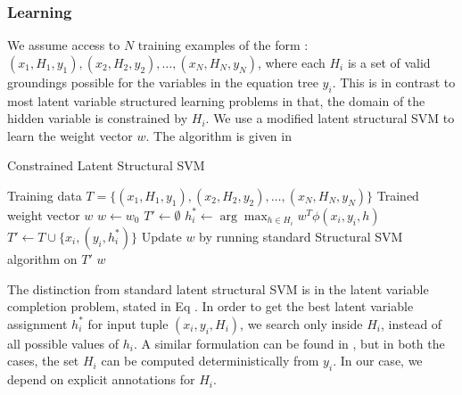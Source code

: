     \subsubsection{Learning}
      We assume access to $N$ training examples of the form : $(x_1,
      H_1, y_1), (x_2, H_2, y_2), \ldots, (x_N, H_N, y_N)$, where each
      $H_i$ is a set of valid groundings possible for the variables in
      the equation tree $y_i$. This is in contrast to most latent
      variable structured learning problems in that, the domain of the
      hidden variable is constrained by $H_i$. We use a modified
      latent structural SVM to learn the weight vector $w$. The algorithm 
      is given in 

      \begin{algorithm}
       \caption{Constrained Latent Structural SVM}
       \label{lssvm}
       \begin{algorithmic}[1]
         \REQUIRE Training data $T = \{(x_1, H_1, y_1), (x_2, H_2, y_2),
         \ldots, (x_N, H_N, y_N)\}$ 
         \ENSURE Trained weight vector $w$
         \STATE $w \leftarrow w_0$
         \REPEAT 
           \STATE $T' \leftarrow \emptyset$
             \STATE $h_i^* \leftarrow \arg\max_{h \in H_i} w^T\phi(x_i, y_i, h)$
             \STATE $T' \leftarrow T \cup \{x_i, (y_i, h_i^*)\}$  
           \ENDFOR
           \STATE Update $w$ by running standard Structural SVM algorithm
           on $T'$
         \RETURN $w$
       \end{algorithmic}
      \end{algorithm}


      

      The distinction from standard latent structural SVM is in the
      latent variable completion problem, stated in Eq . In order to
      get the best latent variable assignment $h_i^*$ for input tuple
      $(x_i, y_i, H_i)$, we search only inside $H_i$, instead of all
      possible values of $h_i$. A similar formulation can be found in
      \cite{ZettlemoyerCo07,BjorkelundKu14}, but in both the cases,
      the set $H_i$ can be computed deterministically from $y_i$. In
      our case, we depend on explicit annotations for $H_i$.

